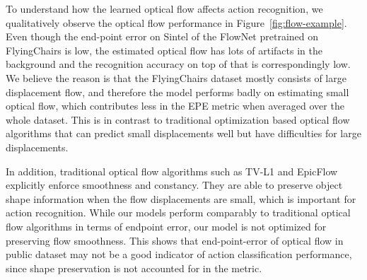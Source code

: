 \documentclass[10pt,twocolumn,letterpaper]{article}
\begin{document}
To understand how the learned optical flow affects action recognition, we qualitatively observe the optical flow performance in Figure~\ref{fig:flow-example}.
Even though the end-point error on Sintel of the FlowNet pretrained on FlyingChairs is low, the estimated optical flow has lots of artifacts in the background and the recognition accuracy on top of that is correspondingly low.
We believe the reason is that the FlyingChairs dataset mostly consists of large displacement flow, and therefore the model performs badly on estimating small optical flow, which contributes less in the EPE metric when averaged over the whole dataset.
This is in contrast to traditional optimization based optical flow algorithms that can predict small displacements well but have difficulties for large displacements.


In addition, traditional optical flow algorithms such as TV-L1 and EpicFlow explicitly enforce smoothness and constancy. They are able to preserve object shape information when the flow displacements are small, which is important for action recognition.
While our models perform comparably to traditional optical flow algorithms in terms of endpoint error, our model is not optimized for preserving flow smoothness. 
This shows that end-point-error of optical flow in public dataset may not be a good indicator of action classification performance, since shape preservation is not accounted for in the metric.

\end{document}
